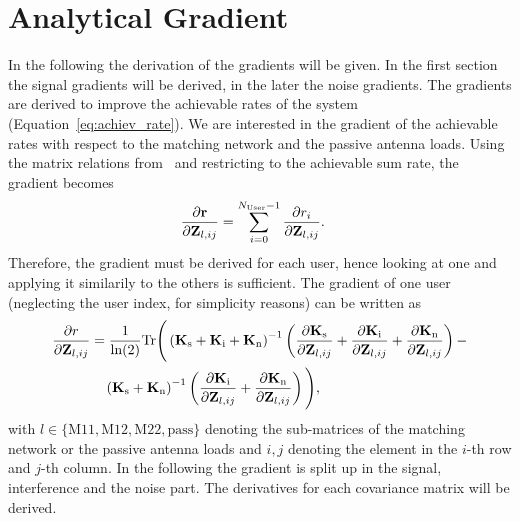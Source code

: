 \chapter{Analytical Gradient}
\label{sec:ana_grad}

In the following the derivation of the gradients will be given.
In the first section the signal gradients will be derived, in the later the noise gradients.
The gradients are derived to improve the achievable rates of the system (Equation~\eqref{eq:achiev_rate}).
We are interested in the gradient of the achievable rates with respect to the matching network and the passive antenna loads.
Using the matrix relations from~\cite{Codebook12} and restricting to the achievable sum rate, the gradient becomes
\begin{align}
\label{eq:gradient}
\frac{\partial \mathbf{r}}{\partial \mathbf{Z}_{l,ij}} &=
\sum_{i=0}^{N_\text{User}-1} \frac{\partial r_i}{\partial\mathbf{Z}_{l,ij}}.
\end{align}
Therefore, the gradient must be derived for each user, hence looking at one and applying it similarily to the others is sufficient.
The gradient of one user (neglecting the user index, for simplicity reasons) can be written as
\begin{align}
\label{eq:usergrad}
\frac{\partial r}{\partial\mathbf{Z}_{l,ij}} &= \frac{1}{\text{ln}(2)} 
\text{Tr}\Bigg(\left(\mathbf{K}_{\text{s}} +
	\mathbf{K}_{\text{i}} +
	\mathbf{K}_{\text{n}}\right)^{-1}
\left(\frac{\partial\mathbf{K}_{\text{s}}}{\partial\mathbf{Z}_{l,ij}}+
 	\frac{\partial\mathbf{K}_{\text{i}}}{\partial\mathbf{Z}_{l,ij}}+
 	\frac{\partial\mathbf{K}_{\text{n}}}{\partial\mathbf{Z}_{l,ij}}\right)-\\
 &\quad\left(\mathbf{K}_{\text{s}}+\mathbf{K}_{\text{n}}\right)^{-1}
 	\left(\frac{\partial\mathbf{K}_{\text{i}}}{\partial\mathbf{Z}_{l,ij}}+
 	\frac{\partial\mathbf{K}_{\text{n}}}{\partial\mathbf{Z}_{l,ij}}\right)\Bigg),
\end{align}
with $l\in\{\text{M}11,\text{M}12,\text{M}22,\text{pass}\}$ denoting the sub-matrices of the matching network or the passive antenna loads and $i,j$ denoting the element in the $i$-th row and $j$-th column.
In the following the gradient is split up in the signal, interference and the noise part.
The derivatives for each covariance matrix will be derived.


